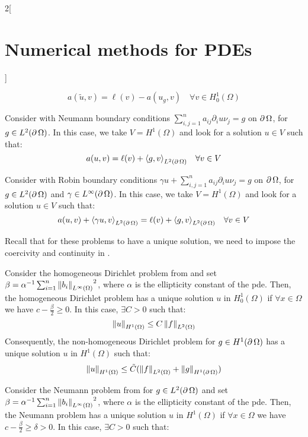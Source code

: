 \documentclass[../../../main_math.tex]{subfiles}
\begin{document}
\begin{multicols}{2}[\section{Numerical methods for PDEs}]
\begin{definition}
    $$
      a(\tilde{u},v)=\ell(v)-a(u_g,v)\quad\forall v\in H^1_0(\Omega)
    $$
  \end{definition}
  \begin{definition}
    Consider  with Neumann boundary conditions $\sum_{i,j=1}^n a_{ij}\partial_i u\nu_j=g$ on $\operatorname{\partial}\Omega$, for $g\in L^2(\operatorname{\partial}\Omega)$. In this case, we take $V=H^1(\Omega)$ and look for a solution $u\in V$ such that:
    $$
      a(u,v)=\ell(v)+{\langle g,v\rangle}_{L^2(\operatorname{\partial}\Omega)}\quad\forall v\in V
    $$
  \end{definition}
  \begin{definition}
    Consider  with Robin boundary conditions $\gamma u+\sum_{i,j=1}^n a_{ij}\partial_i u\nu_j=g$ on $\operatorname{\partial}\Omega$, for $g\in L^2(\operatorname{\partial}\Omega)$ and $\gamma\in L^\infty(\operatorname{\partial}\Omega)$. In this case, we take $V=H^1(\Omega)$ and look for a solution $u\in V$ such that:
    $$
      a(u,v)+{\langle \gamma u,v\rangle}_{L^2(\operatorname{\partial}\Omega)}=\ell(v)+{\langle g,v\rangle}_{L^2(\operatorname{\partial}\Omega)}\quad\forall v\in V
    $$
  \end{definition}
  \begin{remark}
    Recall that for these problems to have a unique solution, we need to impose the coercivity and continuity in .
  \end{remark}
  \begin{proposition}
    Consider the homogeneous Dirichlet problem from  and set $\beta=\alpha^{-1}\sum_{i=1}^n{\left\|b_i\right\|_{L^\infty(\Omega)}}^2$, where $\alpha$ is the ellipticity constant of the pde. Then, the homogeneous Dirichlet problem has a unique solution $u$ in $H_0^1(\Omega)$ if $\forall x\in\Omega$ we have $c-\frac{\beta}{2}\geq 0$. In this case, $\exists C>0$ such that:
    $$
      \left\|u\right\|_{H^1(\Omega)}\leq C\left\|f\right\|_{L^2(\Omega)}
    $$
    Consequently, the non-homogeneous Dirichlet problem for $g\in H^1(\operatorname{\partial}\Omega)$ has a unique solution $u$ in $H^1(\Omega)$ such that:
    $$
      \left\|u\right\|_{H^1(\Omega)}\leq \tilde{C}(\left\|f\right\|_{L^2(\Omega)}+\left\|g\right\|_{H^1(\operatorname{\partial}\Omega)})
    $$
  \end{proposition}
  \begin{proposition}
    Consider the Neumann problem from  for $g\in L^2(\operatorname{\partial}\Omega)$ and set $\beta=\alpha^{-1}\sum_{i=1}^n{\left\|b_i\right\|_{L^\infty(\Omega)}}^2$, where $\alpha$ is the ellipticity constant of the pde. Then, the Neumann problem has a unique solution $u$ in $H^1(\Omega)$ if $\forall x\in\Omega$ we have $c-\frac{\beta}{2}\geq\delta> 0$. In this case, $\exists C>0$ such that:

\end{proposition}
\end{multicols}
\end{document}
